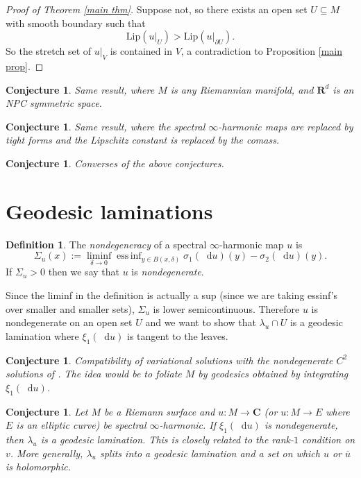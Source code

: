 \documentclass[reqno,11pt]{amsart}
\newcommand{\RR}{\mathbf{R}}
\newcommand{\CC}{\mathbf{C}}
\newcommand*\dif{\mathop{}\!\mathrm{d}}
\newcommand{\Lip}{\mathrm{Lip}}
\DeclareMathOperator*{\essinf}{ess\,inf}
\newcommand{\dfn}[1]{\emph{#1}\index{#1}}
\newtheorem{conjecture}[theorem]{Conjecture}
\theoremstyle{definition}
\newtheorem{definition}[theorem]{Definition}
\numberwithin{equation}{section}
\begin{document}
\begin{proof}[Proof of Theorem \ref{main thm}]
Suppose not, so there exists an open set $U \subseteq M$ with smooth boundary such that 
$$\Lip(u|_U) > \Lip(u|_{\partial U}).$$
So the stretch set of $u|_V$ is contained in $V$, a contradiction to Proposition \ref{main prop}.
\end{proof}

\begin{conjecture}
Same result, where $M$ is any Riemannian manifold, and $\RR^d$ is an NPC symmetric space.
\end{conjecture}

\begin{conjecture}
Same result, where the spectral $\infty$-harmonic maps are replaced by tight forms and the Lipschitz constant is replaced by the comass.
\end{conjecture}

\begin{conjecture}
Converses of the above conjectures.
\end{conjecture}

\section{Geodesic laminations}
\begin{definition}
The \dfn{nondegeneracy} of a spectral $\infty$-harmonic map $u$ is 
$$\Sigma_u(x) := \liminf_{\delta \to 0} \essinf_{y \in B(x, \delta)} \sigma_1(\dif u)(y) - \sigma_2(\dif u)(y).$$
If $\Sigma_u > 0$ then we say that $u$ is \dfn{nondegenerate}.
\end{definition}

Since the liminf in the definition is actually a sup (since we are taking essinf's over smaller and smaller sets), $\Sigma_u$ is lower semicontinuous.
Therefore $u$ is nondegenerate on an open set $U$ and we want to show that $\lambda_u \cap U$ is a geodesic lamination where $\xi_1(\dif u)$ is tangent to the leaves.
  
\begin{conjecture}
Compatibility of variational solutions with the nondegenerate $C^2$ solutions of \cite{Sheffield2010VectorvaluedOL}.
The idea would be to foliate $M$ by geodesics obtained by integrating $\xi_1(\dif u)$.
\end{conjecture}

\begin{conjecture}
Let $M$ be a Riemann surface and $u: M \to \CC$ (or $u: M \to E$ where $E$ is an elliptic curve) be spectral $\infty$-harmonic.
If $\xi_1(\dif u)$ is nondegenerate, then $\lambda_u$ is a geodesic lamination.
This is closely related to the rank-$1$ condition on $v$.
More generally, $\lambda_u$ splits into a geodesic lamination and a set on which $u$ or $\overline u$ is holomorphic.
\end{conjecture}


\printbibliography
\end{document}
